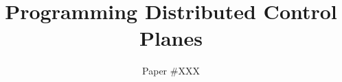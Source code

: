 \documentclass{sig-alternate-10pt}
\begin{document}
\setlength{\pdfpageheight}{\paperheight}
\setlength{\pdfpagewidth}{\paperwidth}

\title{Programming Distributed Control Planes}
\author{Paper \#XXX}

\maketitle
















\end{document}
